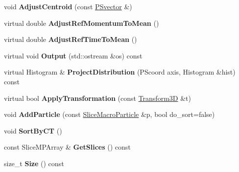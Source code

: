 \begin{DoxyCompactItemize}
void {\bfseries Adjust\+Centroid} (const \hyperlink{classPSvector}{P\+Svector} \&)
\item 
\mbox{\label{classSMPTracking_1_1SMPBunch_a6418d9e6af2764e95d75ea635f6b18a1}} 
virtual double {\bfseries Adjust\+Ref\+Momentum\+To\+Mean} ()
\item 
\mbox{\label{classSMPTracking_1_1SMPBunch_a866c05bad3e512c353aab282b88dadfd}} 
virtual double {\bfseries Adjust\+Ref\+Time\+To\+Mean} ()
\item 
\mbox{\label{classSMPTracking_1_1SMPBunch_a8ec8f9e3bd6019cc5991937691c8ad0a}} 
virtual void {\bfseries Output} (std\+::ostream \&os) const
\item 
\mbox{\label{classSMPTracking_1_1SMPBunch_a8d97a43f30a16c9462695b1ed28ac9a6}} 
virtual Histogram \& {\bfseries Project\+Distribution} (P\+Scoord axis, Histogram \&hist) const
\item 
\mbox{\label{classSMPTracking_1_1SMPBunch_ae8ba3c3ca84f1d04e9b8e1211be81085}} 
virtual bool {\bfseries Apply\+Transformation} (const \hyperlink{classTransform3D}{Transform3D} \&t)
\item 
\mbox{\label{classSMPTracking_1_1SMPBunch_a7ab74083bb72dde291981686c559fb05}} 
void {\bfseries Add\+Particle} (const \hyperlink{classSMPTracking_1_1SliceMacroParticle}{Slice\+Macro\+Particle} \&p, bool do\+\_\+sort=false)
\item 
\mbox{\label{classSMPTracking_1_1SMPBunch_a7ca43610247d2f4bdcee706a9e75c480}} 
void {\bfseries Sort\+By\+CT} ()
\item 
\mbox{\label{classSMPTracking_1_1SMPBunch_a1e9b44d85e3c8f60c02693f5a36874b7}} 
const Slice\+M\+P\+Array \& {\bfseries Get\+Slices} () const
\item 
\mbox{\label{classSMPTracking_1_1SMPBunch_a11905dc454784efe383800634e34575e}} 
size\+\_\+t {\bfseries Size} () const
\item 

\end{DoxyCompactItemize}
